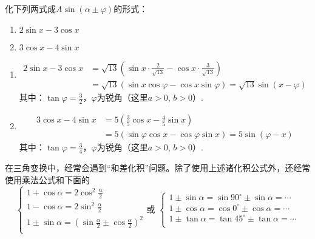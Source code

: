 \begin{example}
化下列两式成$A\sin(\alpha\pm\varphi)$的形式：
\begin{multicols}{2}
\begin{enumerate}[(1)]
    \item $2\sin x-3\cos x$
    \item $3\cos x-4\sin x$
\end{enumerate}
\end{multicols}
\end{example}

\begin{solution}
\begin{enumerate}[(1)]
    \item \[\begin{split}
        2\sin x-3\cos x&=\sqrt{13}\left(\sin x\cdot \frac{2}{\sqrt{13}}-\cos x\cdot \frac{3}{\sqrt{13}}\right)      \\
&=\sqrt{13}(\sin x\cos\varphi-\cos x\sin\varphi)=\sqrt{13}\sin(x-\varphi)
    \end{split}\]
其中：$\tan\varphi=\frac{3}{2}$，$\varphi$为锐角（这里$a>0$, $b>0$）.

\item \[\begin{split}
    3\cos x-4\sin x&=5\left(\frac{3}{5}\cos x-\frac{4}{5}\sin x\right)\\
    &=5(\sin\varphi\cos x-\cos\varphi\sin x)=5\sin(\varphi-x)
\end{split}\]
其中：$\tan\varphi=\frac{3}{4}$，$\varphi$为锐角（这里$a>0$, $b>0$）.
\end{enumerate}
\end{solution}

在三角变换中，经常会遇到“和差化积”问题。除了使用上述诸化积公式外，还经常使用乘法公式和下面的
\[\begin{cases}
1+\cos\alpha=2\cos^2\frac{\alpha}{2} \\ 
1-\cos\alpha=2\sin^2\frac{\alpha}{2} \\ 
1\pm \sin\alpha=\left(\sin\frac{\alpha}{2}\pm\cos \frac{\alpha}{2} \right)^2 \\ 
\end{cases}\text{或 } \begin{cases}
    1\pm \sin\alpha=\sin90^{\circ}\pm\sin \alpha=\cdots\\
    1\pm \cos\alpha=\cos0^{\circ}\pm\cos \alpha=\cdots\\
    1\pm \tan\alpha=\tan45^{\circ}\pm\tan \alpha=\cdots\\
\end{cases}\]

